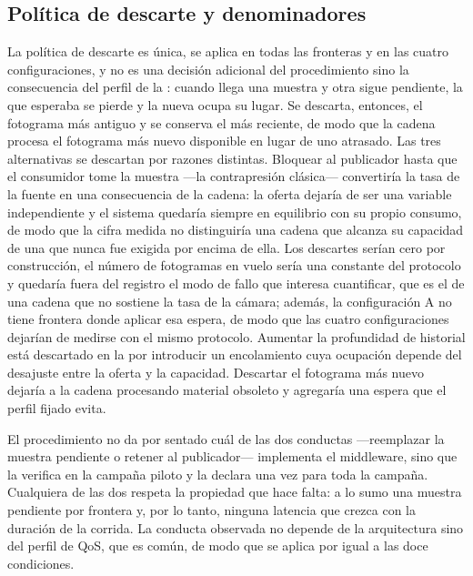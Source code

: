 \subsection{Política de descarte y denominadores}
\label{sec:discards}

La política de descarte es única, se aplica en todas las fronteras y en las
cuatro configuraciones, y no es una decisión adicional del procedimiento
sino la consecuencia del perfil de la : cuando llega una
muestra y otra sigue pendiente, la que esperaba se pierde y la nueva ocupa
su lugar. Se descarta, entonces, el fotograma más antiguo y se conserva el
más reciente, de modo que la cadena procesa el fotograma más nuevo
disponible en lugar de uno atrasado. Las tres alternativas se descartan por
razones distintas. Bloquear al publicador hasta que el consumidor tome la
muestra ---la contrapresión clásica--- convertiría la tasa de la fuente en
una consecuencia de la cadena: la oferta dejaría de ser una variable
independiente y el sistema quedaría siempre en equilibrio con su propio
consumo, de modo que la cifra medida no distinguiría una cadena que alcanza
su capacidad de una que nunca fue exigida por encima de ella. Los descartes
serían cero por construcción, el número de fotogramas en vuelo sería una
constante del protocolo y quedaría fuera del registro el modo de fallo que
interesa cuantificar, que es el de una cadena que no sostiene la tasa de la
cámara; además, la configuración A no tiene frontera donde aplicar esa
espera, de modo que las cuatro configuraciones dejarían de medirse con el
mismo protocolo. Aumentar la profundidad de historial está descartado en la
 por introducir un encolamiento cuya ocupación depende del
desajuste entre la oferta y la capacidad. Descartar el fotograma más nuevo
dejaría a la cadena procesando material obsoleto y agregaría una espera que
el perfil fijado evita.

El procedimiento no da por sentado cuál de las dos conductas ---reemplazar
la muestra pendiente o retener al publicador--- implementa el middleware,
sino que la verifica en la campaña piloto y la declara una vez para toda la
campaña. Cualquiera de las dos respeta la propiedad que hace falta: a lo
sumo una muestra pendiente por frontera y, por lo tanto, ninguna latencia
que crezca con la duración de la corrida. La conducta observada no depende
de la arquitectura sino del perfil de QoS, que es común, de modo que se
aplica por igual a las doce condiciones.

